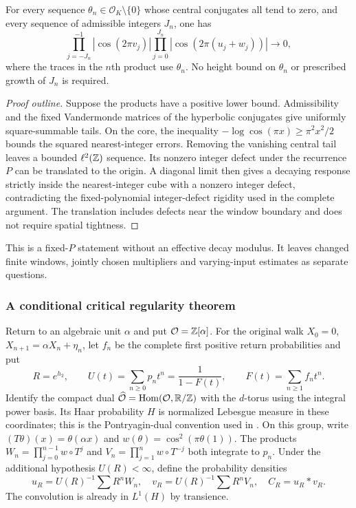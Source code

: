 \begin{proposition}\label{fo:transition-collapse}
For every sequence $\theta_n\in\mathcal O_K\setminus\{0\}$ whose central conjugates all tend to zero, and every sequence of admissible integers $J_n$, one has
\[
 \prod_{j=-J_n}^{-1}|\cos(2\pi v_j)|
 \prod_{j=0}^{J_n}|\cos(2\pi(u_j+w_j))|
 \longrightarrow0,
\]
where the traces in the $n$th product use $\theta_n$.
No height bound on $\theta_n$ or prescribed growth of $J_n$ is required.
\end{proposition}
\begin{proof}[Proof outline]
Suppose the products have a positive lower bound.
Admissibility and the fixed Vandermonde matrices of the hyperbolic conjugates give uniformly square-summable tails.
On the core, the inequality $-\log\cos(\pi x)\ge\pi^2x^2/2$ bounds the squared nearest-integer errors.
Removing the vanishing central tail leaves a bounded $\ell^2(\mathbb Z)$ sequence.
Its nonzero integer defect under the recurrence $P$ can be translated to the origin.
A diagonal limit then gives a decaying response strictly inside the nearest-integer cube with a nonzero integer defect, contradicting the fixed-polynomial integer-defect rigidity used in the complete argument.
The translation includes defects near the window boundary and does not require spatial tightness.
\end{proof}
This is a fixed-$P$ statement without an effective decay modulus.
It leaves changed finite windows, jointly chosen multipliers and varying-input estimates as separate questions.

\subsubsection{A conditional critical regularity theorem}
\label{ret:fractional}

Return to an algebraic unit $\alpha$ and put $\mathcal O=\mathbb Z[\alpha]$.
For the original walk $X_0=0$, $X_{n+1}=\alpha X_n+\eta_n$, let $f_n$ be the complete first positive return probabilities and put
\[
 R=e^{h_2},\qquad U(t)=\sum_{n\geq0}p_nt^n
       =\frac1{1-F(t)},\qquad F(t)=\sum_{n\geq1}f_nt^n.
\]
Identify the compact dual $\widehat{\mathcal O}=\operatorname{Hom}(\mathcal O,\mathbb R/\mathbb Z)$ with the $d$-torus using the integral power basis.
Its Haar probability $H$ is normalized Lebesgue measure in these coordinates; this is the Pontryagin-dual convention used in \citet{DGB16}.
On this group, write $(T\theta)(x)=\theta(\alpha x)$ and $w(\theta)=\cos^2(\pi\theta(1))$.
The products $W_n=\prod_{j=0}^{n-1}w\circ T^j$ and $V_n=\prod_{j=1}^{n}w\circ T^{-j}$ both integrate to $p_n$.
Under the additional hypothesis $U(R)<\infty$, define the probability densities
\[
 u_R=U(R)^{-1}\sum R^nW_n,\quad
 v_R=U(R)^{-1}\sum R^nV_n,\quad C_R=u_R*v_R.
\]
The convolution is already in $L^1(H)$ by transience.

